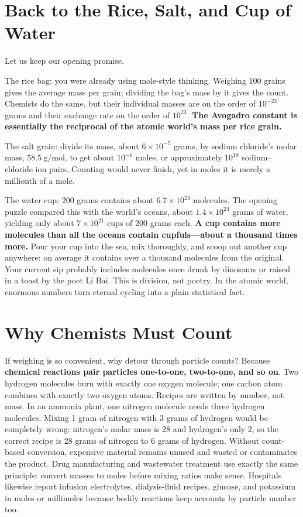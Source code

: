 \section{Back to the Rice, Salt, and Cup of Water}

Let us keep our opening promise.

The rice bag: you were already using mole-style thinking. Weighing 100 grains gives the average mass per grain; dividing the bag's mass by it gives the count. Chemists do the same, but their individual masses are on the order of $10^{-23}$ grams and their exchange rate on the order of $10^{23}$. \textbf{The Avogadro constant is essentially the reciprocal of the atomic world's mass per rice grain.}

The salt grain: divide its mass, about $6\times 10^{-5}$ grams, by sodium chloride's molar mass, $58.5\ \mathrm{g/mol}$, to get about $10^{-6}$ moles, or approximately $10^{18}$ sodium--chloride ion pairs. Counting would never finish, yet in moles it is merely a millionth of a mole.

The water cup: 200 grams contains about $6.7\times 10^{24}$ molecules. The opening puzzle compared this with the world's oceans, about $1.4\times 10^{24}$ grams of water, yielding only about $7\times 10^{21}$ cups of 200 grams each. \textbf{A cup contains more molecules than all the oceans contain cupfuls---about a thousand times more.} Pour your cup into the sea, mix thoroughly, and scoop out another cup anywhere: on average it contains over a thousand molecules from the original. Your current sip probably includes molecules once drunk by dinosaurs or raised in a toast by the poet Li Bai. This is division, not poetry. In the atomic world, enormous numbers turn eternal cycling into a plain statistical fact.

\section{Why Chemists Must Count}

If weighing is so convenient, why detour through particle counts? Because \textbf{chemical reactions pair particles one-to-one, two-to-one, and so on}. Two hydrogen molecules burn with exactly one oxygen molecule; one carbon atom combines with exactly two oxygen atoms. Recipes are written by number, not mass. In an ammonia plant, one nitrogen molecule needs three hydrogen molecules. Mixing 1 gram of nitrogen with 3 grams of hydrogen would be completely wrong: nitrogen's molar mass is 28 and hydrogen's only 2, so the correct recipe is 28 grams of nitrogen to 6 grams of hydrogen. Without count-based conversion, expensive material remains unused and wasted or contaminates the product. Drug manufacturing and wastewater treatment use exactly the same principle: convert masses to moles before mixing ratios make sense. Hospitals likewise report infusion electrolytes, dialysis-fluid recipes, glucose, and potassium in moles or millimoles because bodily reactions keep accounts by particle number too.

